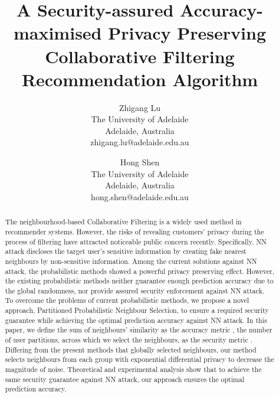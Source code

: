 \documentclass[11pt]{article}
\begin{document}
\newtheorem{definition}{Definition}[]
\renewcommand{\algorithmicrequire}{\textbf{Input:}}
\renewcommand{\algorithmicensure}{\textbf{Output:}}
\title{A Security-assured Accuracy-maximised Privacy Preserving Collaborative Filtering Recommendation Algorithm}
\date{}

\author{
Zhigang Lu\\
       The University of Adelaide\\
       Adelaide, Australia\\
       zhigang.lu@adelaide.edu.au
\and
Hong Shen\\
			The University of Adelaide\\
			Adelaide, Australia\\
			hong.shen@adelaide.edu.au}

\maketitle
~\\
\begin{abstract}
The neighbourhood-based Collaborative Filtering is a widely used method in recommender systems. However, the risks of revealing customers' privacy during the process of filtering have attracted noticeable public concern recently. Specifically, NN attack discloses the target user's sensitive information by creating  fake nearest neighbours by non-sensitive information. Among the current solutions against NN attack, the probabilistic methods showed a powerful privacy preserving effect. However, the existing probabilistic methods neither guarantee enough prediction accuracy due to the global randomness, nor provide assured security enforcement against NN attack. To overcome the problems of current probabilistic methods, we propose a novel approach, Partitioned Probabilistic Neighbour Selection, to ensure a required security guarantee while achieving the optimal prediction accuracy against NN attack. In this paper, we define the sum of  neighbours' similarity as the accuracy metric , the number of user partitions, across which we select the  neighbours, as the security metric . Differing from the present methods that globally selected neighbours, our method selects neighbours from each group with exponential differential privacy to decrease the magnitude of noise. Theoretical and experimental analysis show that to achieve the same security guarantee against NN attack, our approach ensures the optimal prediction accuracy.
\end{abstract}
~\\
\end{document}
